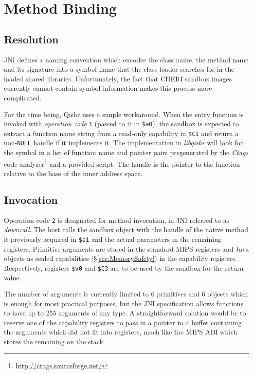 \documentclass[a4paper,12pt,twoside,openright]{report}
\newcommand{\reg}[1]{\texttt{\$#1}}
\newcommand{\tool}[1]{\emph{#1}}
\newcommand{\lib}[1]{\tool{lib#1}}
\begin{document}
\section{Method Binding}

\subsection{Resolution}

JNI defines a naming convention which encodes the class name, the method name and its signature into a symbol name that the class loader searches for in the loaded shared libraries. Unfortunately, the fact that CHERI sandbox images currently cannot contain symbol information makes this process more complicated.

For the time being, Qishr uses a simple workaround. When the entry function is invoked with \emph{operation code} \texttt{1} (passed to it in \reg{a0}), the sandbox is expected to extract a function name string from a read-only capability in \reg{C1} and return a non-\texttt{NULL} handle if it implements it. The implementation in \lib{qishr} will look for the symbol in a list of function name and pointer pairs pregenerated by the \tool{Ctags} code analyzer\footnote{\url{http://ctags.sourceforge.net/}} and a provided script. The handle is the pointer to the function relative to the base of the inner address space.

\subsection{Invocation}

Operation code \texttt{2} is designated for method invocation, in JNI referred to as \emph{downcall}. The host calls the sandbox object with the handle of the native method it previously acquired in \reg{a1} and the actual parameters in the remaining registers. Primitive arguments are stored in the standard MIPS registers and Java objects as sealed capabilities (\S\ref{sec:MemorySafety}) in the capability registers. Respectively, registers \reg{v0} and \reg{C3} are to be used by the sandbox for the return value.

The number of arguments is currently limited to 6 primitives and 6 objects which is enough for most practical purposes, but the JNI specification allows functions to have up to 255 arguments of any type. A straightforward solution would be to reserve one of the capability registers to pass in a pointer to a buffer containing the arguments which did not fit into registers, much like the MIPS ABI which stores the remaining on the stack.
\end{document}

